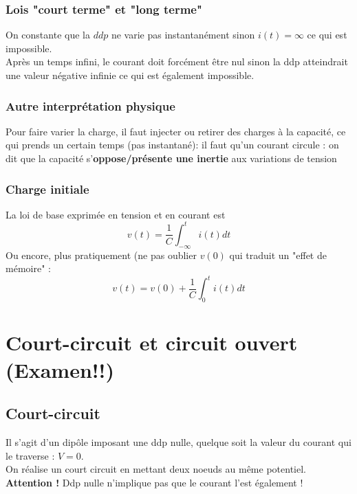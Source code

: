\documentclass	[11pt, a4paper, openany]{book}
\begin{document}
	\subsubsection{Lois "court terme" et "long terme"}
	On constante que la $ddp$ ne varie pas instantanément sinon $i(t) = \infty$ ce qui est impossible.\\
	Après un temps infini, le courant doit forcément être nul sinon la ddp atteindrait une valeur négative infinie ce qui est également impossible.
	
	\subsubsection{Autre interprétation physique}
	Pour faire varier la charge, il faut injecter ou retirer des charges à la capacité, ce qui prends un certain temps (pas instantané): il faut qu'un courant circule : on dit que la capacité s'\textbf{oppose/présente une inertie} aux variations de tension
	
	\subsubsection{Charge initiale}
	La loi de base exprimée en tension et en courant est 
	\begin{equation}
		v(t) = \frac{1}{C} \int_{-\infty}^t i(t) dt
	\end{equation}
	Ou encore, plus pratiquement (ne pas oublier $v(0)$ qui traduit un "effet de mémoire" :
	\begin{equation}
		v(t) = v(0) + \frac{1}{C} \int_0^t i(t) dt
	\end{equation}
	
	
	
	
	
	
	
	\setcounter{section}{6}
	\section{Court-circuit et circuit ouvert (Examen!!)}
	\subsection{Court-circuit}
	Il s'agit d'un dipôle imposant une ddp nulle, quelque soit la valeur du courant qui le traverse : $V = 0$.\\ On réalise un court circuit en mettant deux noeuds au même potentiel.
	\textbf{Attention !} Ddp nulle n'implique pas que le courant l'est également !
	
\end{document}
